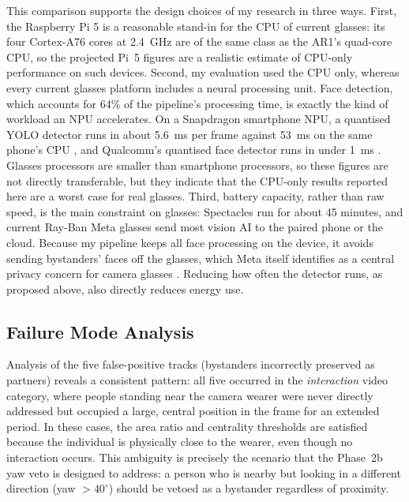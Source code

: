 This comparison supports the design choices of my research in three ways. First, the
Raspberry Pi 5 is a reasonable stand-in for the CPU of current glasses: its four
Cortex-A76 cores at 2.4~GHz are of the same class as the AR1's quad-core CPU, so
the projected Pi~5 figures are a realistic estimate of CPU-only performance on such
devices. Second, my evaluation used the CPU only, whereas every current glasses
platform includes a neural processing unit. Face detection, which accounts for 64\%
of the pipeline's processing time, is exactly the kind of workload an NPU
accelerates. On a Snapdragon smartphone NPU, a quantised YOLO detector runs in about
5.6~ms per frame against 53~ms on the same phone's CPU \cite{ref:ultralytics_qnn},
and Qualcomm's quantised face detector runs in under 1~ms \cite{ref:qcom_facedet}.
Glasses processors are smaller than smartphone processors, so these figures are not
directly transferable, but they indicate that the CPU-only results reported here are
a worst case for real glasses. Third, battery capacity, rather than raw speed, is
the main constraint on glasses: Spectacles run for about 45 minutes, and current
Ray-Ban Meta glasses send most vision AI to the paired phone or the cloud. Because
my pipeline keeps all face processing on the device, it avoids sending bystanders'
faces off the glasses, which Meta itself identifies as a central privacy concern for
camera glasses \cite{ref:meta_bystander}. Reducing how often the detector runs, as
proposed above, also directly reduces energy use.

\subsection{Failure Mode Analysis}
\label{sec:disc_failures}

Analysis of the five false-positive tracks (bystanders incorrectly preserved as
partners) reveals a consistent pattern: all five occurred in the \emph{interaction}
video category, where people standing near the camera wearer were never directly
addressed but occupied a large, central position in the frame for an extended
period. In these cases, the area ratio and centrality thresholds are satisfied
because the individual is physically close to the wearer, even though no interaction
occurs. This ambiguity is precisely the scenario that the Phase~2b yaw veto is
designed to address: a person who is nearby but looking in a different direction
(yaw $> 40^\circ$) should be vetoed as a bystander regardless of proximity.

